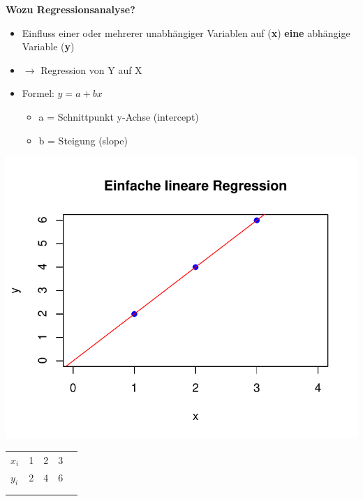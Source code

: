 \documentclass[aspectratio=169, journal, x11names, unknownkeysallowed, hyperref={colorlinks,
linkcolor = SS2,
urlcolor  = F3,
citecolor = F3,
anchorcolor = A4}, 12pt]{beamer}
\newcommand{\oarrow}{\textcolor{A1}{$\rightarrow$} }
\begin{document}
    \begin{frame}[t]
      \textbf{Wozu Regressionsanalyse?}
      \begin{minipage}[t]{0.45\textwidth}
        \vspace{-11.5em}
        \begin{itemize}
            \item Einfluss einer oder mehrerer unabhängiger Variablen auf (\textbf{x}) \linebreak \textbf{eine} abhängige Variable (\textbf{y})\item[] \oarrow Regression von Y auf X
            \item Formel: $y = a + bx$
            \begin{itemize}
              \item a = Schnittpunkt y-Achse (intercept)
              \item b = Steigung (slope)
            \end{itemize}
        \end{itemize}
      \end{minipage}%
      \begin{minipage}[t]{0.45\textwidth}
        \centering
        \includegraphics[scale=0.5]{../Plots/reg_lin_1.pdf}
        \begin{table}[]
          \begin{tabular}{lllll}
          \multicolumn{1}{l|}{\textbf{$x_i$}} & 1 & 2 & 3 &  \\ \cline{1-4}
          \multicolumn{1}{l|}{$y_i$} & 2 & 4 & 6 &  \\
                                 &   &   &   &  \\
                                 &   &   &   & 
          \end{tabular}
          \end{table}
      \end{minipage}
    \end{frame}
\end{document}
